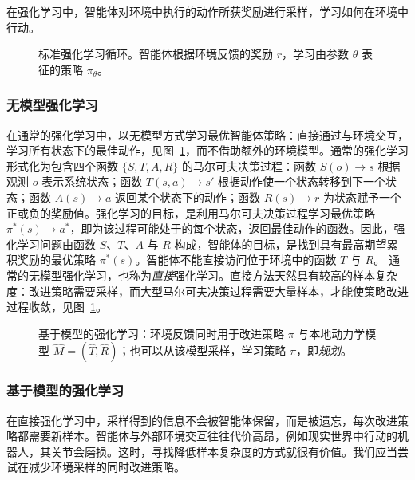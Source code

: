 在强化学习中，智能体对环境中执行的动作所获奖励进行采样，学习如何在环境中行动。

\begin{figure}
  \begin{center}
    
    \caption{标准强化学习循环。智能体根据环境反馈的奖励 $r$，学习由参数 $\theta$ 表征的策略 $\pi_\theta$。\citep{sutton2018reinforcement}}\label{fig:rl7b}
  \end{center}
\end{figure}

\subsubsection{无模型强化学习}
在通常的强化学习中，以无模型方式学习最优智能体策略：直接通过与环境交互，学习所有状态下的最佳动作，见图~\ref{fig:rl7b}，而不借助额外的环境模型。通常的强化学习形式化为包含四个函数 $\{S, T, A, R\}$ 的马尔可夫决策过程：函数 $S(o)\rightarrow s$ 根据观测 $o$ 表示系统状态；函数 $T(s,a)\rightarrow s'$ 根据动作使一个状态转移到下一个状态；函数 $A(s)\rightarrow a$ 返回某个状态下的动作；函数 $R(s)\rightarrow r$ 为状态赋予一个正或负的奖励值。强化学习的目标，是利用马尔可夫决策过程学习最优策略 $\pi^*(s)\rightarrow a^*$，即为该过程可能处于的每个状态，返回最佳动作的函数。因此，强化学习问题由函数 $S$、$T$、$A$ 与 $R$ 构成，智能体的目标，是找到具有最高期望累积奖励的最优策略 $\pi^*(s)$。智能体不能直接访问位于环境中的函数 $T$ 与 $R$。
通常的无模型强化学习，也称为{\em 直接}强化学习。直接方法天然具有较高的样本复杂度：改进策略需要采样，而大型马尔可夫决策过程需要大量样本，才能使策略改进过程收敛，见图~\ref{fig:rl7b}。

\begin{figure}[ht]
  \begin{center}
    
    \caption{基于模型的强化学习：环境反馈同时用于改进策略 $\pi$ 与本地动力学模型 $\hat{M}=(\hat{T},\hat{R})$；也可以从该模型采样，学习策略 $\pi$，即{\em 规划}。}\label{fig:mbrl}
  \end{center}
\end{figure}

\subsubsection{基于模型的强化学习}
在直接强化学习中，采样得到的信息不会被智能体保留，而是被遗忘，每次改进策略都需要新样本。智能体与外部环境交互往往代价高昂，例如现实世界中行动的机器人，其关节会磨损。这时，寻找降低样本复杂度的方式就很有价值。我们应当尝试在减少环境采样的同时改进策略。

